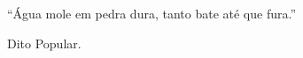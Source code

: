 \begin{epigrafe}
``Água mole em pedra dura, tanto bate até que fura.''

\hfill Dito Popular.
\end{epigrafe}